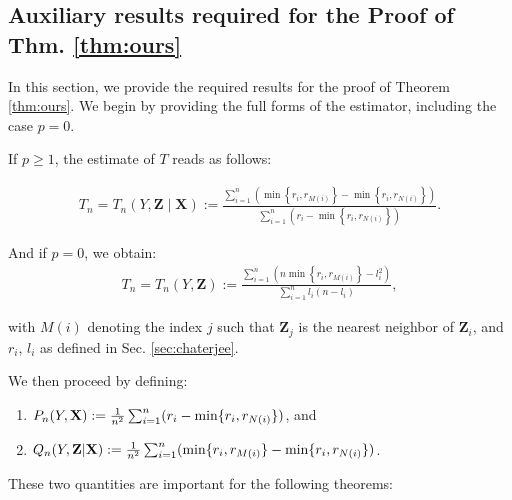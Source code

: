\subsection{Auxiliary results required for the Proof of Thm. \ref{thm:ours}}
\label{appx:aux_results}
In this section, we provide the required results for the proof of Theorem \ref{thm:ours}. We begin by providing the full forms of the estimator, including the case $p=0$.

If $p \geq 1$, the estimate of $T$ reads as follows:

\begin{align}
    T_n=T_n(Y, \mathbf{Z} \mid \mathbf{X}):=\frac{\sum_{i=1}^n\left(\min \left\{r_i, r_{M(i)}\right\}-\min \left\{r_i, r_{N(i)}\right\}\right)}{\sum_{i=1}^n\left(r_i-\min \left\{r_i, r_{N(i)}\right\}\right)}.
\end{align}


And if $p=0$,  we obtain:
\begin{align}
T_n=T_n(Y, \mathbf{Z}):=\frac{\sum_{i=1}^n\left(n \min \left\{r_i, r_{M(i)}\right\}-l_i^2\right)}{\sum_{i=1}^n l_i\left(n-l_i\right)},
\label{eqn:mona_estim_without_x}
\end{align}


with $M(i)$ denoting the index $j$ such that $\mathbf{Z}_j$ is the nearest neighbor of $\mathbf{Z}_i$, and $r_i$, $l_i$ as defined in Sec. \ref{sec:chaterjee}.

We then proceed by defining:
    \begin{enumerate}
        \item $P_n(Y, \mathbf{X}) := \frac{1}{n^2} \sum_{i=1}^n (r_i - \min\{r_i, r_{N(i)}\})$, and
        \item $Q_n(Y, \mathbf{Z} |\mathbf{X}) := \frac{1}{n^2} \sum_{i=1}^n (\min\{r_i, r_{M(i)}\} - \min\{r_i, r_{N(i)}\})$.
    \end{enumerate}

These two quantities are important for the following theorems:

